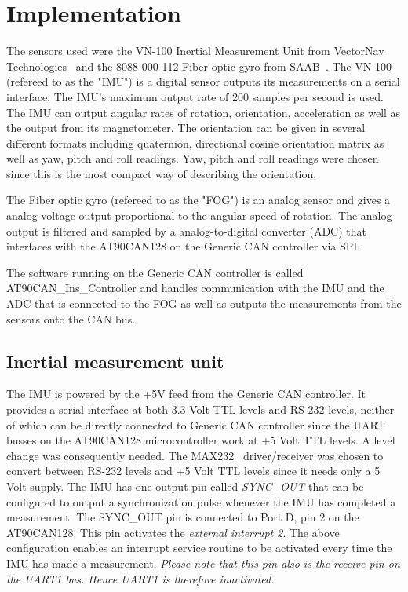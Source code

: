 
\section{Implementation}\label{sec:implementation}
The sensors used were the VN-100 Inertial Measurement Unit from VectorNav Technologies~\cite{web:vn100} and the 8088 000-112 Fiber optic gyro from SAAB~\cite{web:fog1}. The VN-100 (refereed to as the "IMU") is a digital sensor outputs its measurements on a serial interface. The IMU's  maximum output rate of 200 samples per second is used. The IMU can output angular rates of rotation, orientation, acceleration as well as the output from its magnetometer. The orientation can be given in several different formats including quaternion, directional cosine orientation matrix as well as yaw, pitch and roll readings. Yaw, pitch and roll readings were chosen since this is the most compact way of describing the orientation.

The Fiber optic gyro (refereed to as the "FOG") is an analog sensor and gives a analog voltage output proportional to the angular speed of rotation. The analog output is filtered and sampled by a analog-to-digital converter (ADC) that interfaces with the AT90CAN128 on the Generic CAN controller via SPI.

The software running on the Generic CAN controller is called AT90CAN\_Ins\_Controller and handles communication with the IMU and the ADC that is connected to the FOG as well as outputs the measurements from the sensors onto the CAN bus.

\subsection{Inertial measurement unit}
The IMU is powered by the +5V feed from the Generic CAN controller. It provides a serial interface at both 3.3 Volt TTL levels and RS-232 levels, neither of which can be directly connected to Generic CAN controller since the UART busses on the AT90CAN128 microcontroller work at +5 Volt TTL levels. A level change was consequently needed. The MAX232~\cite{web:max232} driver/receiver was chosen to convert between RS-232 levels and +5 Volt TTL levels since it needs only a 5 Volt supply. \newline
The IMU has one output pin called \emph{SYNC\_OUT} that can be configured to output a synchronization pulse whenever the IMU has completed a measurement. The SYNC\_OUT pin is connected to Port D, pin 2 on the AT90CAN128. This pin activates the \emph{external interrupt 2}. \newline
The above configuration enables an interrupt service routine to be activated every time the IMU has made a measurement.\newline 
\emph{Please note that this pin also is the receive pin on the UART1 bus. Hence UART1 is therefore inactivated.} 


